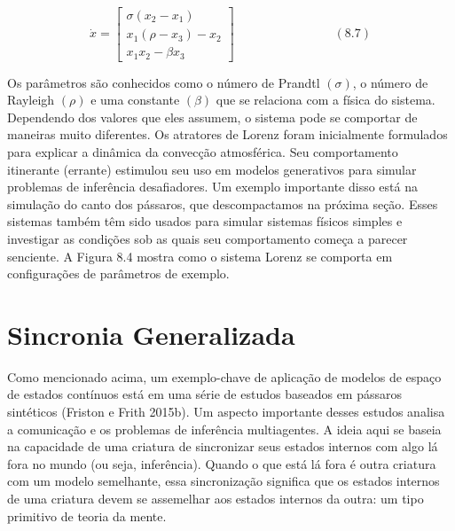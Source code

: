 \documentclass[
  12pt,
]{book}
\begin{document}
\[\dot x = \begin{bmatrix}  \sigma (x_2 - x_1) \\ x_1(\rho - x_3) - x_2 \\ x_1x_2 - \beta x_3  \end{bmatrix} \qquad\qquad\qquad\qquad (8.7)\]

Os parâmetros são conhecidos como o número de Prandtl \((\sigma)\), o número de Rayleigh \((\rho)\) e uma constante \((\beta)\) que se relaciona com a física do sistema. Dependendo dos valores que eles assumem, o sistema pode se comportar de maneiras muito diferentes. Os atratores de Lorenz foram inicialmente formulados para explicar a dinâmica da convecção atmosférica. Seu comportamento itinerante (errante) estimulou seu uso em modelos generativos para simular problemas de inferência desafiadores. Um exemplo importante disso está na simulação do canto dos pássaros, que descompactamos na próxima seção. Esses sistemas também têm sido usados para simular sistemas físicos simples e investigar as condições sob as quais seu comportamento começa a parecer senciente. A Figura 8.4 mostra como o sistema Lorenz se comporta em configurações de parâmetros de exemplo.

\hypertarget{sincronia-generalizada}{%
\section{Sincronia Generalizada}\label{sincronia-generalizada}}

Como mencionado acima, um exemplo-chave de aplicação de modelos de espaço de estados contínuos está em uma série de estudos baseados em pássaros sintéticos (Friston e Frith 2015b). Um aspecto importante desses estudos analisa a comunicação e os problemas de inferência multiagentes. A ideia aqui se baseia na capacidade de uma criatura de sincronizar seus estados internos com algo lá fora no mundo (ou seja, inferência). Quando o que está lá fora é outra criatura com um modelo semelhante, essa sincronização significa que os estados internos de uma criatura devem se assemelhar aos estados internos da outra: um tipo primitivo de teoria da mente.
\end{document}
